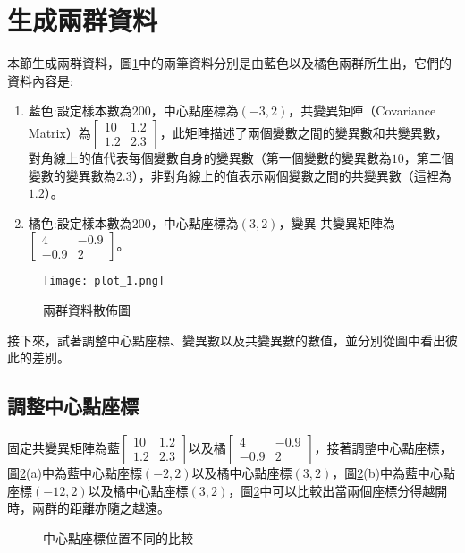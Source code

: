 \documentclass[12pt, a4paper]{article}
\begin{document}
\section{生成兩群資料}
本節生成兩群資料，圖\;\ref{fig:plot_1.png}\;中的兩筆資料分別是由藍色以及橘色兩群所生出，它們的資料內容是\;:
\begin{enumerate}
\item 藍色\;:\;設定樣本數為\;$200$\;，中心點座標為\;$(-3,2)$\;，共變異矩陣（Covariance Matrix）為\;$\begin{bmatrix}10 & 1.2 \\1.2 & 2.3 \end{bmatrix}$\;，此矩陣描述了兩個變數之間的變異數和共變異數，對角線上的值代表每個變數自身的變異數（第一個變數的變異數為\;$10$\;，第二個變數的變異數為\;$2.3$\;），非對角線上的值表示兩個變數之間的共變異數（這裡為\;$1.2$\;）。
\item 橘色\;:\;設定樣本數為\;$200$\;，中心點座標為\;$(3,2)$\;，變異\;-\;共變異矩陣為\;$\begin{bmatrix}4 & -0.9 \\-0.9 & 2 \end{bmatrix}$\;。
\end{enumerate}

\begin{figure}[h]
\centering
\texttt{[image: plot\_1.png]}
\caption{兩群資料散佈圖}
\label{fig:plot_1.png}
\end{figure}

接下來，試著調整中心點座標、變異數以及共變異數的數值，並分別從圖中看出彼此的差別。

\subsection{調整中心點座標}
固定共變異矩陣為藍\;$\begin{bmatrix}10 & 1.2 \\1.2 & 2.3 \end{bmatrix}$\;以及橘\;$\begin{bmatrix}4 & -0.9 \\-0.9 & 2 \end{bmatrix}$\;，接著調整中心點座標，圖\;\ref{fig:parallel4_1}\;(a)\;中為藍中心點座標\;$(-2,2)$\;以及橘中心點座標\;$(3,2)$\;，圖\;\ref{fig:parallel4_1}\;(b)\;中為藍中心點座標\;$(-12,2)$\;以及橘中心點座標\;$(3,2)$\;，圖\;\ref{fig:parallel4_1}\;中可以比較出當兩個座標分得越開時，兩群的距離亦隨之越遠。

\begin{figure}[h]
\centering
{}
\caption{中心點座標位置不同的比較}
\label{fig:parallel4_1}
\end{figure}
\end{document}
